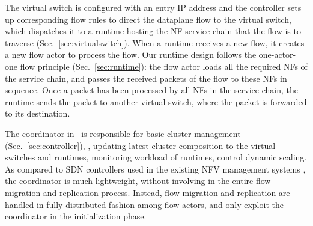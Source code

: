 The virtual switch is configured with an entry IP address and the controller sets up corresponding flow rules to direct the dataplane flow to the virtual switch,%
 which dispatches it to a runtime hosting the NF service chain that the flow is to traverse (Sec.~\ref{sec:virtualswitch}). When a runtime receives a new flow, it creates a new flow actor to process the flow. Our runtime design follows the one-actor-one flow principle (Sec.~\ref{sec:runtime}): the flow actor loads all the required NFs of the service chain, and passes the received packets of the flow to these NFs in sequence. %
 Once a packet has been processed by all NFs in the service chain, the runtime sends the packet to another virtual switch,
where the packet is forwarded to its destination.




The coordinator in \nfactor~is responsible for basic cluster management (Sec.~\ref{sec:controller}), \eg, updating latest cluster composition to the virtual switches and runtimes, monitoring workload of runtimes, control dynamic scaling. %
As compared to SDN controllers used in the existing NFV management systems \cite{gember2015opennf, rajagopalan2013split}%
, the coordinator is much lightweight, without involving in the entire flow migration and replication process.%
 Instead, flow migration and replication are handled in fully distributed fashion among flow actors, and only exploit the coordinator in the initialization phase.

